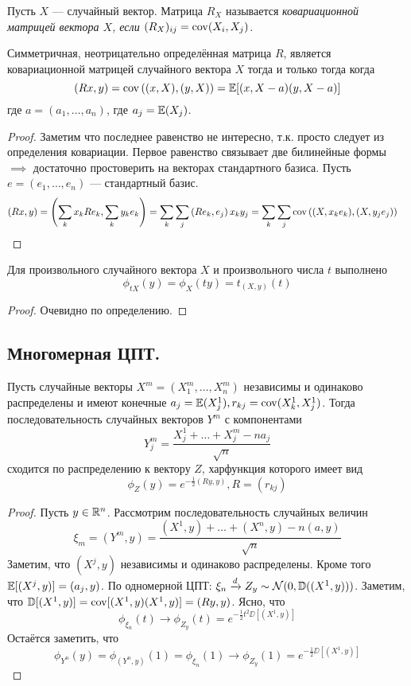 \begin{definition}
    Пусть $X$ --- случайный вектор. Матрица $R_X$ называется \it{ковариационной матрицей вектора $X$}, если
    $(R_X)_{ij} = \operatorname{\mathop{\mathrm{cov}}}(X_i, X_j)$.
\end{definition}
\begin{lemma}
    Симметричная, неотрицательно определённая матрица $R$, является ковариационной матрицей случайного
    вектора $X$ тогда и только тогда когда
    \[
        (Rx, y) = \operatorname{\mathop{\mathrm{cov}}}\left( (x, X), (y, X) \right) = \mathbb{E}[(x, X - a)(y, X - a)]
    \]
    где $a = (a_1, \ldots, a_n)$, где $a_j = \mathbb{E}(X_j)$.
\end{lemma}
\begin{proof}
    Заметим что последнее равенство не интересно, т.к. просто следует из определения ковариации. Первое
    равенство связывает две билинейные формы $\implies$ достаточно простоверить на векторах стандартного
    базиса. Пусть $e = (e_1, \ldots, e_n)$ --- стандартный базис.
    \begin{align*}
    (Rx, y)
        &= \left( \sum_{k} x_kRe_k, \sum_k y_ke_k  \right) = \sum_k\sum_j \left( Re_k, e_j \right)x_{k}y_j
        = \sum_k\sum_j \operatorname{\mathop{\mathrm{cov}}}\left( (X, x_ke_k), (X, y_je_j) \right)
    \end{align*}
\end{proof}
\begin{proposal}
    Для произвольного случайного вектора $X$ и произвольного числа $t$ выполнено
    \[
        \phi_{tX}(y) = \phi_X(ty) = t_{(X, y)}(t)
    \]
\end{proposal}
\begin{proof}
    Очевидно по определению.
\end{proof}

\subsection{Многомерная ЦПТ.}
\begin{theorem}
    Пусть случайные векторы $X^m = (X_1^m, \ldots, X_n^m)$ независимы и одинаково распределены и имеют конечные
    $a_j = \mathbb{E}(X_j^1), r_{kj} = \operatorname{\mathop{\mathrm{cov}}}(X^1_k, X^1_j)$. Тогда последовательность случайных векторов $Y^m$ с компонентами
    \[
        Y_j^m = \frac{X_j^1 + \ldots + X_j^m - na_j}{\sqrt {n}}
    \]
    сходится по распределению к вектору $Z$, харфункция которого имеет вид
    \[
        \phi_Z(y) = e^{-\frac{1}{2}(Ry, y)}, R = (r_{kj})
    \]
\end{theorem}
\begin{proof}
    Пусть $y \in \mathbb{R}^n$. Рассмотрим последовательность случайных величин
    \[
        \xi_m = (Y^m, y) = \frac{(X^1, y) + \ldots + (X^n, y) - n(a, y)}{\sqrt {n}}
    \]
    Заметим, что $(X^j, y)$ независимы и одинаково распределены. Кроме того $\mathbb{E}[(X^j, y)] = (a_j, y)$.
    По одномерной ЦПТ: $\xi_n \xrightarrow{d} Z_y \sim \mathcal{N}(0, \mathbb{D}((X^1, y)))$. Заметим, что
    $\mathbb{D}[(X^1, y)] = \operatorname{\mathop{\mathrm{cov}}}[(X^1, y)(X^1, y)] = (Ry, y)$. Ясно, что
    \[
        \phi_{\xi_n}(t) \to \phi_{Z_y}(t) = e^{-\frac{1}{2}t^2\DD[(X^1, y)]}
    \]
    Остаётся заметить, что
    \[
        \phi_{Y^n}(y) = \phi_{(Y^n, y)}(1) = \phi_{\xi_n}(1) \to \phi_{Z_y}(1) = e^{-\frac{1}{2}\DD[(X^1, y)]}
    \]
\end{proof}

